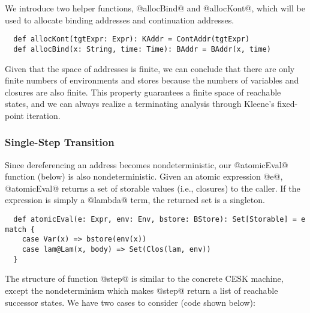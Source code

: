 \documentclass[acmsmall, screen]{acmart}\settopmatter{}
\begin{document}
We introduce two helper functions, @allocBind@ and @allocKont@, which will be
used to allocate binding addresses and continuation addresses.

\begin{lstlisting}
  def allocKont(tgtExpr: Expr): KAddr = ContAddr(tgtExpr)
  def allocBind(x: String, time: Time): BAddr = BAddr(x, time)
\end{lstlisting}

Given that the space of addresses is finite, we can conclude that there are only finite numbers
of environments and stores because the numbers of variables and closures are also finite.
This property guarantees a finite space of reachable states, and we can always realize a
terminating analysis through Kleene's fixed-point iteration.

\subsubsection{Single-Step Transition}

Since dereferencing an address becomes nondeterministic, our @atomicEval@
function (below) is also nondeterministic. Given an atomic expression @e@,
@atomicEval@ returns a set of storable values (i.e., closures) to the caller.
If the expression is simply a @lambda@ term, the returned set is a singleton.

\begin{lstlisting}
  def atomicEval(e: Expr, env: Env, bstore: BStore): Set[Storable] = e match {
    case Var(x) => bstore(env(x))
    case lam@Lam(x, body) => Set(Clos(lam, env))
  }
\end{lstlisting}

The structure of function @step@ is similar to the concrete CESK machine,
except the nondeterminism which makes @step@ return a list of reachable successor states.
We have two cases to consider (code shown below):
\end{document}
